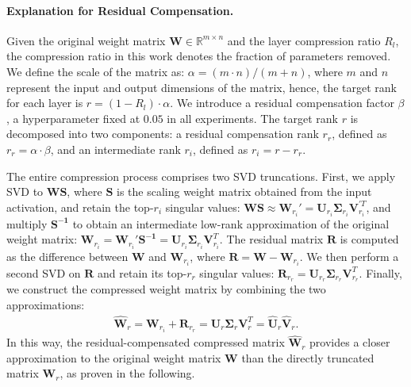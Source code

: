 \paragraph{Explanation for Residual Compensation.} 
Given the original weight matrix $\boldsymbol{W}\in\mathbb{R}^{m\times n}$ and the layer compression ratio $R_l$, the compression ratio in this work denotes the fraction of parameters removed. We define the scale of the matrix as: $\alpha = (m \cdot n) / (m+n)$, where $m$ and $n$ represent the input and output dimensions of the matrix, hence, the target rank for each layer is $r = (1-R_l)\cdot\alpha$. We introduce a residual compensation factor $\beta$, a hyperparameter fixed at $0.05$ in all experiments. The target rank $r$ is decomposed into two components: a residual compensation rank $r_r$, defined as $r_r = \alpha \cdot \beta$, and an intermediate rank $r_i$, defined as $r_i = r - r_r$. 

The entire compression process comprises two SVD truncations.
First, we apply SVD to $\boldsymbol{WS}$, where $\boldsymbol{S}$ is the scaling weight matrix obtained from the input activation, and retain the top-$r_i$ singular values: $\boldsymbol{WS} \approx \boldsymbol{W}_{r_i}' = \boldsymbol{U}_{r_i}\boldsymbol{\Sigma}_{r_i}\boldsymbol{V}_{r_i}^{'T} $, and multiply $\boldsymbol{S^{-1}}$ to obtain an intermediate low-rank approximation of the original weight matrix: $ \boldsymbol{W}_{r_i} = \boldsymbol{W}_{r_i}'\boldsymbol{S^{-1}} = \boldsymbol{U}_{r_i}\boldsymbol{\Sigma}_{r_i}\boldsymbol{V}_{r_i}^T. $
The residual matrix $\boldsymbol{R}$ is computed as the difference between $\boldsymbol{W}$ and $\boldsymbol{W}_{r_i}$, where 
$\boldsymbol{R} = \boldsymbol{W} - \boldsymbol{W}_{r_i}.$
We then perform a second SVD on $\boldsymbol{R}$ and retain its top-$r_r$ singular values: $\boldsymbol{R}_{r_r}=\boldsymbol{U}_{r_r}\boldsymbol{\Sigma}_{r_r}\boldsymbol{V}_{r_r}^T$. 
Finally, we construct the compressed weight matrix by combining the two approximations: 
\begin{align}
 \hat{\boldsymbol{W}}_r=\boldsymbol{W}_{r_i}+\boldsymbol{R}_{r_r} = \boldsymbol{U}_r\boldsymbol{\Sigma}_r\boldsymbol{V}_r^T=\hat{\boldsymbol{U}}_r\hat{\boldsymbol{V}}_r.
\end{align}
In this way, the residual-compensated compressed matrix $\hat{\boldsymbol{W}}_r$ provides a closer approximation to the original weight matrix $\boldsymbol{W}$ than the directly truncated matrix $\boldsymbol{W}_r$, as proven in the following.

